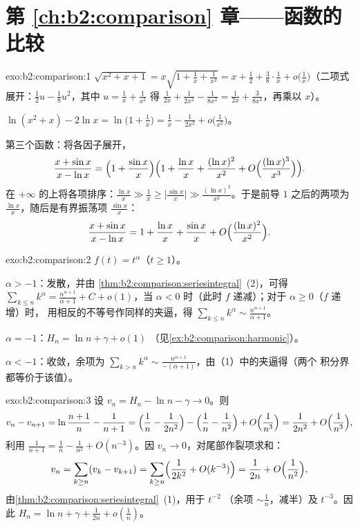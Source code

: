 \section*{第 \ref{ch:b2:comparison} 章——函数的比较}

\begin{solution}{exo:b2:comparison:1}
$\sqrt{x^2 + x + 1} = x\sqrt{1 + \tfrac1x + \tfrac{1}{x^2}} = x +
\frac12 + \frac38\cdot\frac1x + o\bigl(\frac1x\bigr)$（二项式
展开：$\frac12 u - \frac18 u^2$，其中 $u = \frac1x +
\frac{1}{x^2}$ 得 $\frac{1}{2x} + \frac{1}{2x^2} -
\frac{1}{8x^2} = \frac{1}{2x} + \frac{3}{8x^2}$，再乘以
$x$）。

$\ln(x^2 + x) - 2\ln x = \ln\bigl(1 + \tfrac1x\bigr) = \frac1x -
\frac{1}{2x^2} + o\bigl(\frac{1}{x^2}\bigr)$。

第三个函数：将各因子展开，
\[
\frac{x + \sin x}{x - \ln x}
= \Bigl(1 + \frac{\sin x}{x}\Bigr)
\Bigl(1 + \frac{\ln x}{x} + \frac{(\ln x)^2}{x^2} +
O\Bigl(\frac{(\ln x)^3}{x^3}\Bigr)\Bigr).
\]
在 $+\infty$ 的上将各项排序：$\frac{\ln x}{x}
\gg \frac{1}{x} \geq \bigl|\frac{\sin x}{x}\bigr| \gg \frac{(\ln
x)^2}{x^2}$。于是前导 $1$ 之后的两项为
$\frac{\ln x}{x}$，随后是有界振荡项 $\frac{\sin
x}{x}$：
\[
\frac{x + \sin x}{x - \ln x}
= 1 + \frac{\ln x}{x} + \frac{\sin x}{x}
+ O\Bigl(\frac{(\ln x)^2}{x^2}\Bigr).
\]
\end{solution}

\begin{solution}{exo:b2:comparison:2}
$f(t) = t^\alpha$（$t \geq 1$）。

$\alpha > -1$：发散，并由
\cref{thm:b2:comparison:seriesintegral}~(2)，可得 $\sum_{k\leq n}
k^\alpha = \frac{n^{\alpha+1}}{\alpha+1} + C + o(1)$，当 $\alpha <
0$ 时（此时 $f$ 递减）；对于 $\alpha \geq 0$（$f$ 递增）时，
用相反的不等号作同样的夹逼，得 $\sum_{k \leq n}
k^\alpha \sim \frac{n^{\alpha + 1}}{\alpha + 1}$。

$\alpha = -1$：$H_n = \ln n + \gamma + o(1)$
（见\cref{ex:b2:comparison:harmonic}）。

$\alpha < -1$：收敛，余项为 $\sum_{k > n} k^\alpha
\sim \frac{n^{\alpha+1}}{-(\alpha+1)}$，由（1）中的夹逼得（两个
积分界都等价于该值）。
\end{solution}

\begin{solution}{exo:b2:comparison:3}
设 $v_n = H_n - \ln n - \gamma \to 0$。则
\[
v_n - v_{n+1} = \ln\frac{n+1}{n} - \frac{1}{n+1}
= \Bigl(\frac1n - \frac{1}{2n^2}\Bigr) - \Bigl(\frac1n -
\frac{1}{n^2}\Bigr) + O\Bigl(\frac{1}{n^3}\Bigr)
= \frac{1}{2n^2} + O\Bigl(\frac{1}{n^3}\Bigr),
\]
利用 $\frac{1}{n+1} = \frac1n - \frac{1}{n^2} + O(n^{-3})$。因
$v_n \to 0$，对尾部作裂项求和：
\[
v_n = \sum_{k \geq n} (v_k - v_{k+1})
= \sum_{k\geq n} \Bigl(\frac{1}{2k^2} + O(k^{-3})\Bigr)
= \frac{1}{2n} + O\Bigl(\frac{1}{n^2}\Bigr),
\]
由\cref{thm:b2:comparison:seriesintegral}~(1)，用于 $t^{-2}$
（余项 $\sim \frac1n$，减半）及 $t^{-3}$。因此 $H_n =
\ln n + \gamma + \frac{1}{2n} + o(\frac1n)$。
\end{solution}


